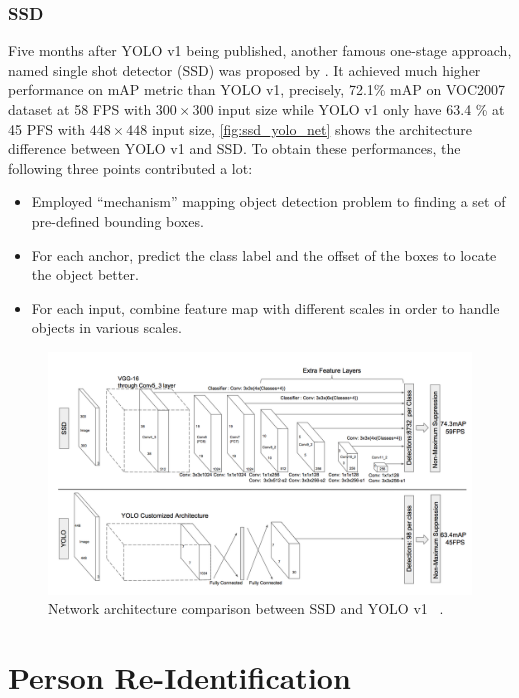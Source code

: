 \subsubsection{SSD}

Five months after YOLO v1 being published, another famous one-stage approach,
named single shot detector (SSD) was
proposed by \cite{ssd-paper-2015}. It achieved much higher performance on mAP
metric than YOLO v1, precisely, 72.1\%
mAP on VOC2007 dataset at 58 FPS with $300 \times 300$ input size while YOLO v1
only have 63.4 \% at 45 PFS with
$448 \times 448$ input size, \autoref{fig:ssd_yolo_net} shows the architecture
difference between YOLO v1 and SSD.
To obtain these performances, the following three points contributed a lot:

\begin{itemize}
    \item Employed ``mechanism'' mapping object detection problem to finding a
    set of pre-defined bounding boxes.

    \item For each anchor, predict the class label and the offset of the
    boxes to locate the object better.

	\item For each input, combine feature map with different scales in order to
	      handle objects in various scales.
\end{itemize}

\begin{figure}
    \includegraphics[width=\linewidth]{figures/ssd_yolo_net_arch.png}
    \caption{Network architecture comparison between SSD and YOLO v1
    ~\protect\cite{ssd-paper-2015}.}
    \label{fig:ssd_yolo_net}
\end{figure}

\section{Person Re-Identification}
\label{sec:related_work_re_id}

